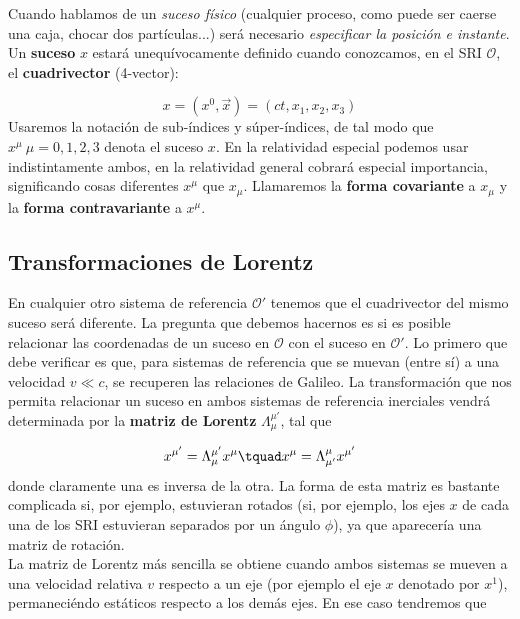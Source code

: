 Cuando hablamos de un \textit{suceso físico} (cualquier proceso, como puede ser caerse una caja, chocar dos partículas...) será necesario \textit{especificar la posición e instante}. Un \textbf{suceso} $x$ estará unequívocamente definido cuando conozcamos, en el SRI $\mathcal{O}$, el  \textbf{cuadrivector} (4-vector):

\begin{equation}
x = (x^0, \vec{x}) = (ct,x_1,x_2,x_3)
\end{equation}
Usaremos la notación de sub-índices y súper-índices, de tal modo que $x^\mu \ \mu=0,1,2,3$ denota el suceso $x$. En la relatividad especial podemos usar indistintamente ambos, en la relatividad general cobrará especial importancia, significando cosas diferentes $x^\mu$ que $x_\mu$. Llamaremos la \textbf{forma covariante} a $x_{\mu}$ y la \textbf{forma contravariante} a $x^{\mu}$. \\

\subsection*{Transformaciones de Lorentz}

En cualquier otro sistema de referencia $\mathcal{O}'$ tenemos que el cuadrivector del mismo suceso será diferente. La pregunta que debemos hacernos es si es posible relacionar las coordenadas de un suceso en $\mathcal{O}$ con el suceso en $\mathcal{O}'$. Lo primero que debe verificar es que, para sistemas de referencia que se muevan (entre sí) a una velocidad $v\ll c$, se recuperen las relaciones de Galileo. La transformación que nos permita relacionar un suceso en ambos sistemas de referencia inerciales vendrá determinada por la \textbf{matriz de Lorentz} $\Lambda_\mu^{\mu'}$, tal que 

\begin{equation}
x^{\mu'} = \Lambda_\mu^{\mu'} x^{\mu}  \tquad 
x^{\mu} = \Lambda_{\mu'}^{\mu} x^{\mu'} 
\end{equation}
donde claramente una es inversa de la otra. La forma de esta matriz es bastante complicada si, por ejemplo, estuvieran rotados (si, por ejemplo, los ejes $x$ de cada una de los SRI estuvieran separados por un ángulo $\phi$), ya que aparecería una matriz de rotación. \\

La matriz de Lorentz más sencilla se obtiene cuando ambos sistemas se mueven a una velocidad relativa $v$ respecto a un eje (por ejemplo el eje $x$ denotado por $x^1$), permaneciéndo estáticos respecto a los demás ejes. En ese caso tendremos que

